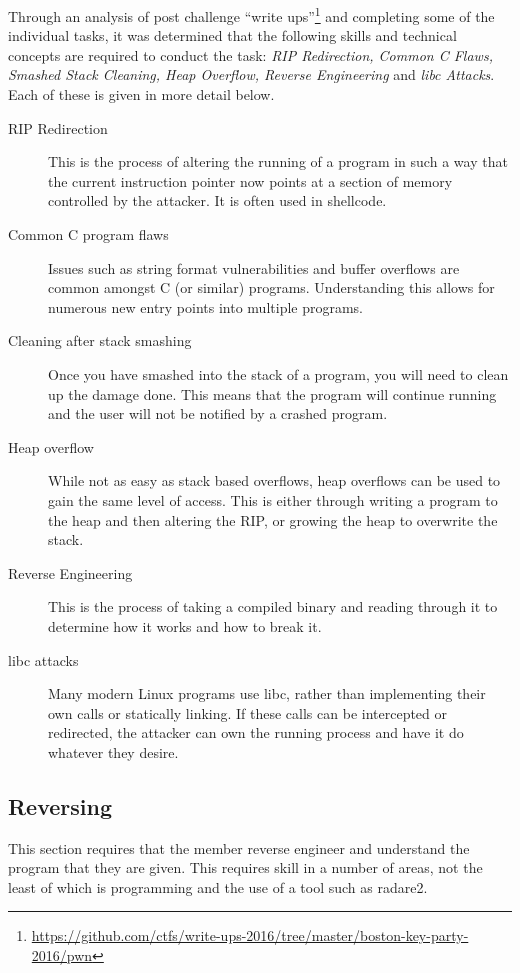\documentclass[twoside,a4paper,11pt]{report}
\begin{document}
			Through an analysis of post challenge ``write ups''\footnote{\url{https://github.com/ctfs/write-ups-2016/tree/master/boston-key-party-2016/pwn}}
			and completing some of the individual tasks, 
			it was determined that the following skills and technical concepts are required to conduct the task: 
			\textit{RIP Redirection, Common C Flaws, Smashed Stack Cleaning, Heap Overflow, Reverse Engineering} and \textit{libc Attacks}.
			Each of these is given in more detail below. 
			\begin{description}
				\item[RIP Redirection] 
					This is the process of altering the running of a program in such a way that the current instruction pointer now points at a section of memory controlled by the attacker. 
					It is often used in shellcode. 
				\item[Common C program flaws] 
					Issues such as string format vulnerabilities and buffer overflows are common amongst C (or similar) programs. 
					Understanding this allows for numerous new entry points into multiple programs. 
				\item[Cleaning after stack smashing] 
					Once you have smashed into the stack of a program, you will need to clean up the damage done. 
					This means that the program will continue running and the user will not be notified by a crashed program. 
				\item[Heap overflow] 
					While not as easy as stack based overflows, heap overflows can be used to gain the same level of access. 
					This is either through writing a program to the heap and then altering the RIP, or growing the heap to overwrite the stack. 
				\item[Reverse Engineering]
					This is the process of taking a compiled binary and reading through it to determine how it works and how to break it. 
				\item[libc attacks] 
					Many modern Linux programs use libc, rather than implementing their own calls or statically linking. 
					If these calls can be intercepted or redirected, the attacker can own the running process and have it do whatever they desire. 
			\end{description}
		\subsection{Reversing}
			This section requires that the member reverse engineer and understand the program that they are given. 
			This requires skill in a number of areas, not the least of which is programming and the use of a tool such as radare2. 
\end{document}
